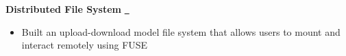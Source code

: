 \textbf{Distributed File System} \href{https://github.com/ininicho/watdfs}{\github\ } \par
\begin{itemize}
  \item Built an upload-download model file system that allows users to mount and interact remotely using FUSE
\end{itemize}
\vspace{0.1cm} \par
